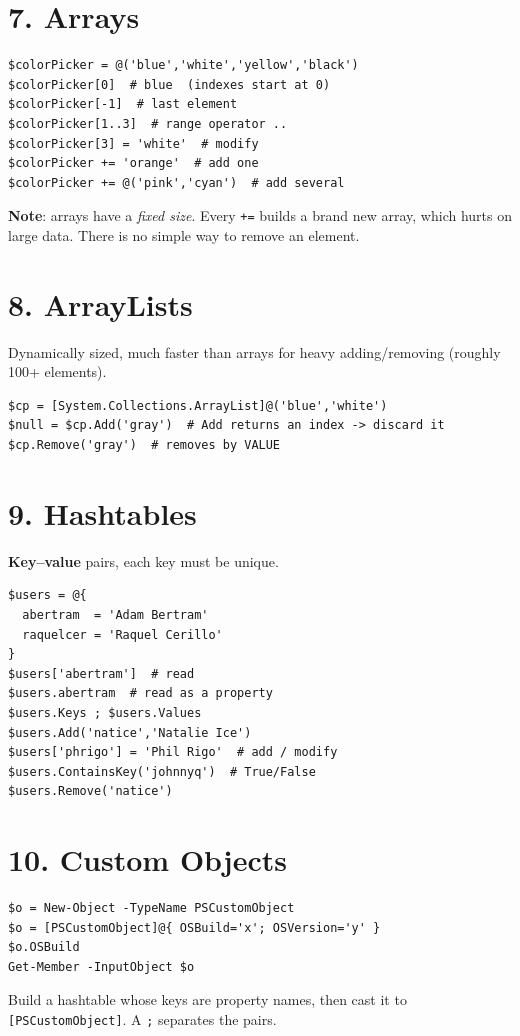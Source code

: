 \section{7. Arrays}
\begin{verbatim}
$colorPicker = @('blue','white','yellow','black')
$colorPicker[0]  # blue  (indexes start at 0)
$colorPicker[-1]  # last element
$colorPicker[1..3]  # range operator ..
$colorPicker[3] = 'white'  # modify
$colorPicker += 'orange'  # add one
$colorPicker += @('pink','cyan')  # add several
\end{verbatim}
\textbf{Note}: arrays have a \emph{fixed size}. Every \texttt{+=} builds a brand new array, which hurts on large data. There is no simple way to remove an element.

\section{8. ArrayLists}
Dynamically sized, much faster than arrays for heavy adding/removing (roughly 100+ elements).
\begin{verbatim}
$cp = [System.Collections.ArrayList]@('blue','white')
$null = $cp.Add('gray')  # Add returns an index -> discard it
$cp.Remove('gray')  # removes by VALUE
\end{verbatim}

\section{9. Hashtables}
\textbf{Key--value} pairs, each key must be unique.
\begin{verbatim}
$users = @{
  abertram  = 'Adam Bertram'
  raquelcer = 'Raquel Cerillo'
}
$users['abertram']  # read
$users.abertram  # read as a property
$users.Keys ; $users.Values
$users.Add('natice','Natalie Ice')
$users['phrigo'] = 'Phil Rigo'  # add / modify
$users.ContainsKey('johnnyq')  # True/False
$users.Remove('natice')
\end{verbatim}

\section{10. Custom Objects}
\begin{verbatim}
$o = New-Object -TypeName PSCustomObject
$o = [PSCustomObject]@{ OSBuild='x'; OSVersion='y' }
$o.OSBuild
Get-Member -InputObject $o
\end{verbatim}
Build a hashtable whose keys are property names, then cast it to \texttt{[PSCustomObject]}. A \texttt{;} separates the pairs.

